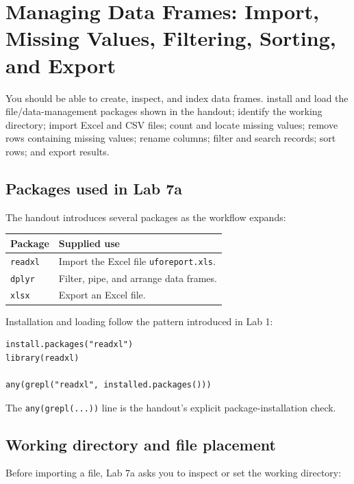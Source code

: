 \chapter{Managing Data Frames: Import, Missing Values, Filtering, Sorting, and Export}
\label{chap:managing-data-frames}

\chapterguide
  {You should be able to create, inspect, and index data frames.}
  {install and load the file/data-management packages shown in the handout; identify the working directory; import Excel and CSV files; count and locate missing values; remove rows containing missing values; rename columns; filter and search records; sort rows; and export results.}

\section{Packages used in Lab 7a}

The handout introduces several packages as the workflow expands:

\begin{dstable}
\begin{tabularx}{\linewidth}{@{}p{3.0cm}X@{}}
\toprule
\rowcolor{DSPaleBlue!92}
Package & Supplied use \\
\midrule
\texttt{readxl} & Import the Excel file \texttt{uforeport.xls}. \\
\texttt{dplyr} & Filter, pipe, and arrange data frames. \\
\texttt{xlsx} & Export an Excel file. \\
\bottomrule
\end{tabularx}
\end{dstable}

Installation and loading follow the pattern introduced in Lab 1:

\begin{lstlisting}[style=dsr]
install.packages("readxl")
library(readxl)

any(grepl("readxl", installed.packages()))
\end{lstlisting}

The \texttt{any(grepl(...))} line is the handout's explicit package-installation check.

\section{Working directory and file placement}

Before importing a file, Lab 7a asks you to inspect or set the working directory:

